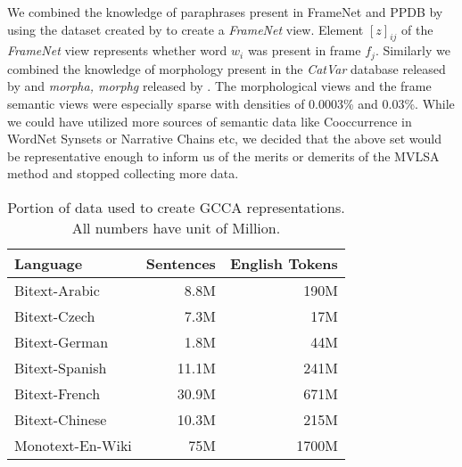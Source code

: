 \documentclass[11pt]{article}
\begin{document}
We combined the knowledge of paraphrases present in FrameNet and PPDB by
using the dataset created by  to create a
\textit{FrameNet} view. Element $[z]_{ij}$ of the \textit{FrameNet}
view represents whether word $w_i$ was present in frame
$f_j$. Similarly we combined the knowledge of morphology present in
the \textit{CatVar} database released by  and
\textit{morpha, morphg} released by .
The morphological views and the frame semantic views were especially
sparse with densities of 0.0003\% and 0.03\%. While we could have utilized more sources of semantic data like
Cooccurrence in WordNet Synsets or Narrative Chains etc, we decided
that the above set would be representative enough to inform us of the
merits or demerits of the MVLSA method and stopped collecting more data.

\begin{table}[htbp]
  \centering
  \begin{tabular}{lrr}
    Language & Sentences & English Tokens \\
    \hline
    Bitext-Arabic   & 8.8M   & 190M  \\
    Bitext-Czech    & 7.3M   & 17M   \\
    Bitext-German   & 1.8M   & 44M   \\
    Bitext-Spanish  & 11.1M  & 241M  \\
    Bitext-French   & 30.9M  & 671M  \\
    Bitext-Chinese  & 10.3M  & 215M  \\
    Monotext-En-Wiki& 75M    & 1700M 
  \end{tabular}  
  \caption{Portion of data used to create GCCA representations. All
    numbers have unit of Million.}
  \label{tab:dataperlang}
\end{table}
\end{document}
